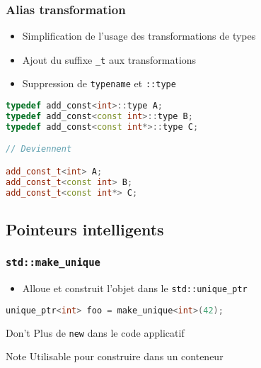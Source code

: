\documentclass[C++.tex]{subfiles}
\begin{document}
\begin{frame}[fragile]
	\frametitle{Alias transformation}
	\begin{itemize}
		\item Simplification de l'usage des transformations de types
		\item Ajout du suffixe \lstinline|_t| aux transformations
		\item Suppression de \lstinline|typename| et \lstinline|::type|
	\end{itemize}

	\begin{lstlisting}[language=C++]
typedef add_const<int>::type A;
typedef add_const<const int>::type B;
typedef add_const<const int*>::type C;

// Deviennent

add_const_t<int> A;
add_const_t<const int> B;
add_const_t<const int*> C;\end{lstlisting}
\end{frame}

\subsection*{Pointeurs intelligents}
\begin{frame}[fragile]
	\frametitle{\lstinline|std::make_unique|}
	\begin{itemize}
		\item Alloue et construit l'objet dans le \lstinline|std::unique_ptr|
	\end{itemize}

	\begin{lstlisting}[language=C++]
unique_ptr<int> foo = make_unique<int>(42);\end{lstlisting}

	\begin{alertblock}{Don't}
		Plus de \lstinline|new| dans le code applicatif
	\end{alertblock}

	\begin{block}{Note}
		Utilisable pour construire dans un conteneur
	\end{block}
\end{frame}
\end{document}
